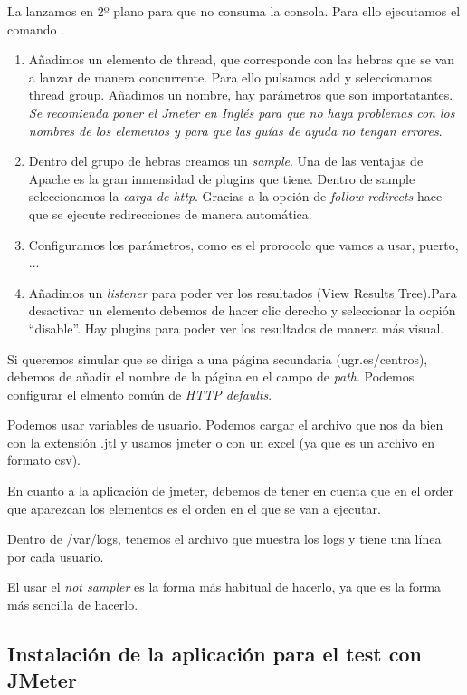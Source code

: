 La lanzamos en 2º plano para que no consuma la consola. Para ello ejecutamos el comando .

\begin{enumerate}
    \item Añadimos un elemento de thread, que corresponde con las hebras que se van a lanzar de manera concurrente. Para ello pulsamos add y seleccionamos thread group. Añadimos un nombre, hay parámetros que son importatantes. \textit{Se recomienda poner el Jmeter en Inglés para que no haya problemas con los nombres de los elementos y para que las guías de ayuda no tengan errores}. 
    \item Dentro del grupo de hebras creamos un \textit{sample}. Una de las ventajas de Apache es la gran inmensidad de plugins que tiene.  Dentro de sample seleccionamos la \textit{carga de http}. Gracias a la opción de \textit{follow redirects} hace que se ejecute redirecciones de manera automática.
    \item Configuramos los parámetros, como es el prorocolo que vamos a usar, puerto, ...
    \item Añadimos un \textit{listener} para poder ver los resultados (View Results Tree).Para desactivar un elemento debemos de hacer clic derecho y seleccionar la ocpión ``disable''. Hay plugins para poder ver los resultados de manera más visual.
\end{enumerate}

Si queremos simular que se diriga a una página secundaria (ugr.es/centros), debemos de añadir el nombre de la página en el campo de \textit{path}.
Podemos configurar el elmento común de\textit{ HTTP defaults}.

Podemos usar variables de usuario.
Podemos cargar el archivo que nos da bien con la extensión .jtl y usamos jmeter o con un excel (ya que es un archivo en formato csv). 

En cuanto a la aplicación de jmeter, debemos de tener en cuenta que en el order que aparezcan los elementos es el orden en el que se van a ejecutar.

Dentro de /var/logs, tenemos el archivo que muestra los logs y tiene una línea por cada usuario.

El usar el \textit{not sampler} es la forma más habitual de hacerlo, ya que es la forma más sencilla de hacerlo.

\subsection*{Instalación de la aplicación para el test con JMeter}

